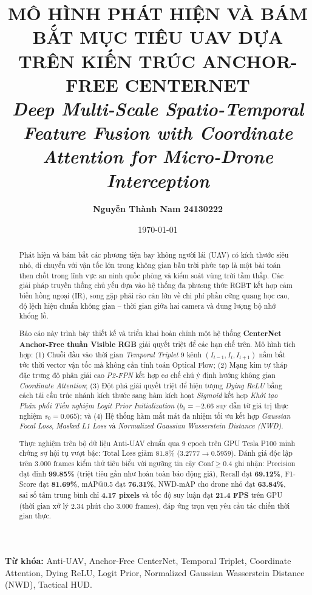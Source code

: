 \documentclass[11pt,a4paper]{article}
\title{\textbf{MÔ HÌNH PHÁT HIỆN VÀ BÁM BẮT MỤC TIÊU UAV DỰA TRÊN KIẾN TRÚC ANCHOR-FREE CENTERNET}\\
\large{\textit{Deep Multi-Scale Spatio-Temporal Feature Fusion with Coordinate Attention for Micro-Drone Interception}}}
\author{\textbf{Nguyễn Thành Nam 24130222}}
\date{\today}
\begin{document}
\maketitle

\begin{abstract}
Phát hiện và bám bắt các phương tiện bay không người lái (UAV) có kích thước siêu nhỏ, di chuyển với vận tốc lớn trong không gian bầu trời phức tạp là một bài toán then chốt trong lĩnh vực an ninh quốc phòng và kiểm soát vùng trời tầm thấp. Các giải pháp truyền thống chủ yếu dựa vào hệ thống đa phương thức RGBT kết hợp cảm biến hồng ngoại (IR), song gặp phải rào cản lớn về chi phí phần cứng quang học cao, độ lệch hiệu chuẩn không gian -- thời gian giữa hai camera và dung lượng bộ nhớ khổng lồ. 

Báo cáo này trình bày thiết kế và triển khai hoàn chỉnh một hệ thống \textbf{CenterNet Anchor-Free thuần Visible RGB} giải quyết triệt để các hạn chế trên. Mô hình tích hợp: 
(1) Chuỗi đầu vào thời gian \textit{Temporal Triplet} 9 kênh $(I_{t-1}, I_t, I_{t+1})$ nắm bắt tức thời vector vận tốc mà không cần tính toán Optical Flow; 
(2) Mạng kim tự tháp đặc trưng độ phân giải cao \textit{P2-FPN} kết hợp cơ chế chú ý định hướng không gian \textit{Coordinate Attention}; 
(3) Đột phá giải quyết triệt để hiện tượng \textit{Dying ReLU} bằng cách tái cấu trúc nhánh kích thước sang hàm kích hoạt \textit{Sigmoid} kết hợp \textit{Khởi tạo Phân phối Tiền nghiệm Logit Prior Initialization} ($b_0 = -2.66$ suy dẫn từ giá trị thực nghiệm $s_0 = 0.065$); và (4) Hệ thống hàm mất mát đa nhiệm tối ưu kết hợp \textit{Gaussian Focal Loss}, \textit{Masked L1 Loss} và \textit{Normalized Gaussian Wasserstein Distance (NWD)}. 

Thực nghiệm trên bộ dữ liệu Anti-UAV chuẩn qua 9 epoch trên GPU Tesla P100 minh chứng sự hội tụ vượt bậc: Total Loss giảm $81.8\%$ ($3.2777 \rightarrow 0.5959$). Đánh giá độc lập trên 3.000 frames kiểm thử tiêu biểu với ngưỡng tin cậy $\text{Conf} \ge 0.4$ ghi nhận: Precision đạt đỉnh \textbf{99.85\%} (triệt tiêu gần như hoàn toàn báo động giả), Recall đạt \textbf{69.12\%}, F1-Score đạt \textbf{81.69\%}, mAP@0.5 đạt \textbf{76.31\%}, NWD-mAP cho drone nhỏ đạt \textbf{63.84\%}, sai số tâm trung bình chỉ \textbf{4.17 pixels} và tốc độ suy luận đạt \textbf{21.4 FPS} trên GPU (thời gian xử lý 2.34 phút cho 3.000 frames), đáp ứng trọn vẹn yêu cầu tác chiến thời gian thực.
\end{abstract}

\textbf{Từ khóa:} Anti-UAV, Anchor-Free CenterNet, Temporal Triplet, Coordinate Attention, Dying ReLU, Logit Prior, Normalized Gaussian Wasserstein Distance (NWD), Tactical HUD.
\end{document}
